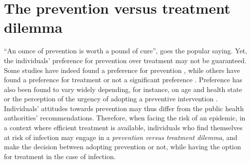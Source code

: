 %
%
%
%

\section{The prevention versus treatment dilemma}
\label{Intro:Dilemma}

``An ounce of prevention is worth a pound of cure'', goes the popular saying. Yet, the individuals' preference for prevention over treatment may not be guaranteed. Some studies have indeed found a preference for prevention \cite[]{Bosworth2010,Mortimer2008}, while others have found a preference for treatment \cite[]{Corso2002,Schwappach2002} or not a significant preference \cite[]{Ubel1998}. Preference has also been found to vary widely depending, for instance, on age and health state \cite[]{Luyten2015} or the perception of the urgency of adopting a preventive intervention \cite[]{Meertens2013}. Individuals' attitudes towards prevention may thus differ from the public health authorities' recommendations. Therefore, when facing the risk of an epidemic, in a context where efficient treatment is available, individuals who find themselves at risk of infection may engage in a \textit{prevention versus treatment dilemma}, and make the decision between adopting prevention or not, while having the option for treatment in the case of infection. 

